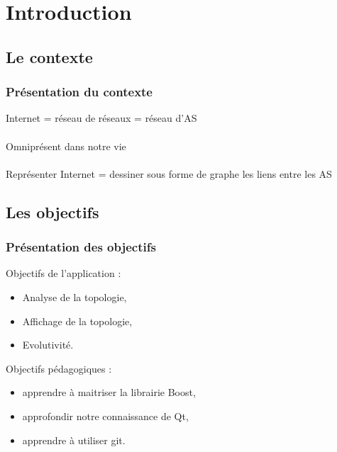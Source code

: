 \section*{Introduction}

\subsection*{Le contexte}
\frame
{
\frametitle{Pr\'esentation du contexte}
Internet = r\'eseau de r\'eseaux = r\'eseau d'AS\\
~\\
Omnipr\'esent dans notre vie\\
~\\
Repr\'esenter Internet = dessiner sous forme de graphe les liens entre les AS
}

\subsection*{Les objectifs}
\frame
{
\frametitle{Pr\'esentation des objectifs}
Objectifs de l'application :
\begin{itemize}
 \item Analyse de la topologie,
 \item Affichage de la topologie,
 \item Evolutivit\'e.
\end{itemize}

Objectifs p\'edagogiques :
\begin{itemize}
 \item apprendre \`a maitriser la librairie Boost,
 \item approfondir notre connaissance de Qt,
 \item apprendre \`a utiliser git.
\end{itemize}

}